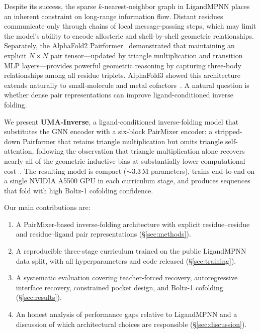 \documentclass[11pt,letterpaper]{article}
\begin{document}
Despite its success, the sparse $k$-nearest-neighbor graph in LigandMPNN places an inherent
constraint on long-range information flow. Distant residues communicate only through chains of
local message-passing steps, which may limit the model's ability to encode allosteric and
shell-by-shell geometric relationships. Separately, the AlphaFold2
Pairformer~\citep{jumper2021highly} demonstrated that maintaining an explicit $N{\times}N$ pair
tensor---updated by triangle multiplication and transition MLP layers---provides powerful geometric
reasoning by capturing three-body relationships among all residue triplets. AlphaFold3 showed this
architecture extends naturally to small-molecule and metal cofactors~\citep{abramson2024accurate}.
A natural question is whether dense pair representations can improve ligand-conditioned inverse
folding.

We present \textbf{UMA-Inverse}, a ligand-conditioned inverse-folding model that substitutes the
GNN encoder with a six-block PairMixer encoder: a stripped-down Pairformer that retains triangle
multiplication but omits triangle self-attention, following the observation that triangle
multiplication alone recovers nearly all of the geometric inductive bias at substantially lower
computational cost~\citep{pearl2026}. The resulting model is compact (${\sim}3.3$\,M parameters),
trains end-to-end on a single NVIDIA A5500 GPU in each curriculum stage, and produces sequences
that fold with high Boltz-1 cofolding confidence.

Our main contributions are:
\begin{enumerate}
  \item A PairMixer-based inverse-folding architecture with explicit residue--residue and
        residue--ligand pair representations (\S\ref{sec:methods}).
  \item A reproducible three-stage curriculum trained on the public LigandMPNN data split,
        with all hyperparameters and code released (\S\ref{sec:training}).
  \item A systematic evaluation covering teacher-forced recovery, autoregressive interface
        recovery, constrained pocket design, and Boltz-1 cofolding (\S\ref{sec:results}).
  \item An honest analysis of performance gaps relative to LigandMPNN and a discussion of
        which architectural choices are responsible (\S\ref{sec:discussion}).
\end{enumerate}

\end{document}
